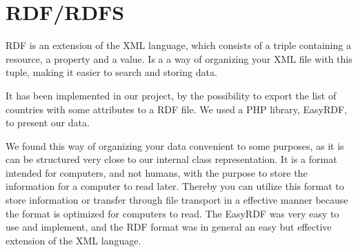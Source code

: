 \section{RDF/RDFS}
RDF is an extension of the XML language, which consists of a triple containing a resource, a property and a value.
Is a a way of organizing your XML file with this tuple, making it easier to search and storing data.

It has been implemented in our project, by the possibility to export the list of countries with some attributes to a RDF file. We used a PHP library, EasyRDF, to present our data.

We found this way of organizing your data convenient to some purposes, as it is can be structured very close to our internal class representation. It is a format intended for computers, and not humans, with the purpose to store the information for a computer to read later. Thereby you can utilize this format to store information or transfer through file transport in a effective manner because the format is optimized for computers to read. The EasyRDF was very easy to use and implement, and the RDF format was in general an easy but effective extension of the XML language.